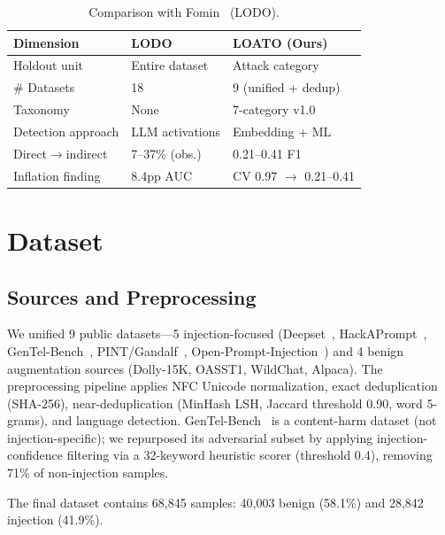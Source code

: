 \documentclass[11pt,a4paper]{article}
\newcommand{\Fone}{F1}
\begin{document}
\begin{table}[t]
\centering
\small
\caption{Comparison with Fomin~\citeyearpar{fomin2026benchmarks} (LODO).}
\label{tab:fomin}
\begin{tabular}{lll}
\toprule
\textbf{Dimension} & \textbf{LODO} & \textbf{LOATO (Ours)} \\
\midrule
Holdout unit & Entire dataset & Attack category \\
\# Datasets & 18 & 9 (unified + dedup) \\
Taxonomy & None & 7-category v1.0 \\
Detection approach & LLM activations & Embedding + ML \\
Direct$\to$indirect & 7--37\% (obs.) & 0.21--0.41 \Fone{} \\
Inflation finding & 8.4pp AUC & CV 0.97 $\to$ 0.21--0.41 \\
\bottomrule
\end{tabular}
\end{table}

\section{Dataset}
\label{sec:dataset}

\subsection{Sources and Preprocessing}

We unified 9 public datasets---5 injection-focused
(Deepset~\citep{deepset2023promptinjections},
HackAPrompt~\citep{schulhoff2023hackaprompt},
GenTel-Bench~\citep{gentel2024bench},
PINT/Gandalf~\citep{lakera2023gandalf},
Open-Prompt-Injection~\citep{liu2024formalizing}) and 4 benign augmentation
sources (Dolly-15K, OASST1, WildChat, Alpaca). The preprocessing pipeline
applies NFC Unicode normalization, exact deduplication (SHA-256),
near-deduplication (MinHash LSH, Jaccard threshold 0.90, word 5-grams), and
language detection. GenTel-Bench~\citep{gentel2024bench} is a content-harm dataset (not
injection-specific); we repurposed its adversarial subset by applying
injection-confidence filtering via a 32-keyword heuristic scorer (threshold
0.4), removing 71\% of non-injection samples.

The final dataset contains 68,845 samples: 40,003 benign (58.1\%) and 28,842 injection (41.9\%).
\end{document}
